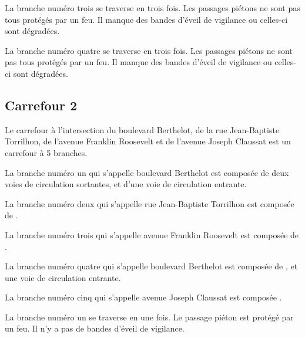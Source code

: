 \begin{appendix}
La branche numéro trois se traverse en trois fois. Les passages piétons ne sont pas tous protégés par un feu. Il manque des bandes d'éveil de vigilance ou celles-ci sont dégradées.

\newpar{}

La branche numéro quatre se traverse en trois fois. Les passages piétons ne sont pas tous protégés par un feu. Il manque des bandes d'éveil de vigilance ou celles-ci sont dégradées.

\subsection*{Carrefour 2}

\label{annexe:q_ID39_carrefour2}

Le carrefour à l'intersection du boulevard Berthelot, de la rue Jean-Baptiste Torrilhon, de l'avenue Franklin Roosevelt et de l'avenue Joseph Claussat est un carrefour à 5 branches.

\newpar{}

La branche numéro un qui s'appelle boulevard Berthelot est composée de deux voies de circulation sortantes, et d'une voie de circulation entrante.

\newpar{}

La branche numéro deux qui s'appelle rue Jean-Baptiste Torrilhon est composée de .

\newpar{}

La branche numéro trois qui s'appelle avenue Franklin Roosevelt est composée de .

\newpar{}

La branche numéro quatre qui s'appelle boulevard Berthelot est composée de , et une voie de circulation entrante.

\newpar{}

La branche numéro cinq qui s'appelle avenue Joseph Claussat est composée .

\newpar{}

La branche numéro un se traverse en une fois. Le passage piéton est protégé par un feu. Il n'y a pas de bandes d'éveil de vigilance.

\newpar{}


\end{appendix}
